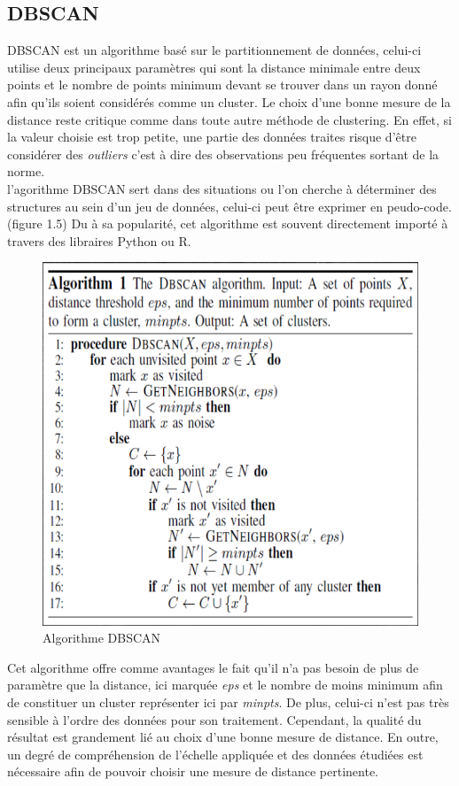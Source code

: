 \documentclass[memoire.tex]{subfiles}
\begin{document}
\subsection{DBSCAN}
DBSCAN est un algorithme basé sur le partitionnement de données, celui-ci utilise deux principaux paramètres qui sont la distance minimale entre deux points et le nombre de points minimum devant se trouver dans un rayon donné afin qu'ils soient considérés comme un cluster\cite{ref12}. Le choix d'une bonne mesure de la distance reste critique comme dans toute autre méthode de clustering. En effet, si la valeur choisie est trop petite, une partie des données traites risque d'être considérer des \textit {outliers} c'est à dire des observations peu fréquentes sortant de la norme.\\
l'agorithme DBSCAN sert dans des situations ou l'on cherche à déterminer des structures au sein d'un jeu de données, celui-ci peut être exprimer en peudo-code.(figure 1.5) Du à sa popularité, cet algorithme est souvent directement importé à travers des libraires Python ou R.
	\begin{figure}[h!]
		\centerline{\includegraphics[scale=0.8]{img/dbscan.png}}
		\caption{Algorithme DBSCAN}
	\end{figure}
Cet algorithme offre comme avantages le fait qu'il n'a pas besoin de plus de paramètre que la distance, ici marquée \textit{eps} et le nombre de moins minimum afin de constituer un cluster représenter ici par \textit{minpts}. De plus, celui-ci n'est pas très sensible à l'ordre des données pour son traitement. Cependant, la qualité du résultat est grandement lié au choix d'une bonne mesure de distance. En outre, un degré de compréhension de l'échelle appliquée et des données étudiées est nécessaire afin de pouvoir choisir une mesure de distance pertinente.
\end{document}
